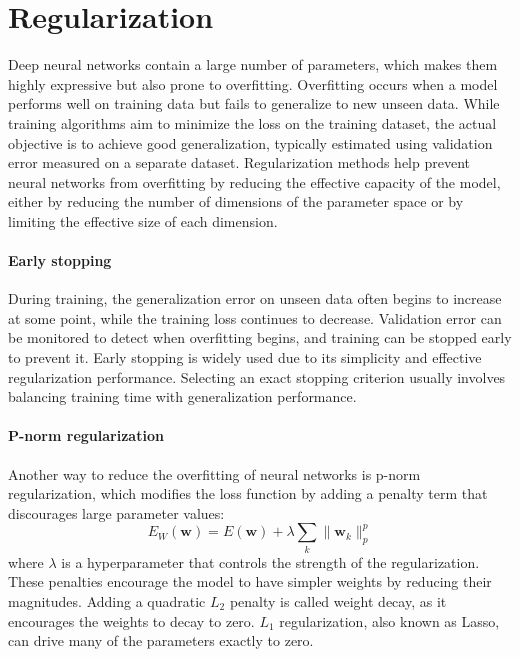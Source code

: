 \section{Regularization}
Deep neural networks contain a large number of parameters, which makes them highly expressive but also prone to overfitting. Overfitting occurs when a model performs well on training data but fails to generalize to new unseen data. While training algorithms aim to minimize the loss on the training dataset, the actual objective is to achieve good generalization, typically estimated using validation error measured on a separate dataset. Regularization methods help prevent neural networks from overfitting by reducing the effective capacity of the model, either by reducing the number of dimensions of the parameter space or by limiting the effective size of each dimension.~\cite{Krichen2023, Prechelt1998}

\paragraph{Early stopping} During training, the generalization error on unseen data often begins to increase at some point, while the training loss continues to decrease. Validation error can be monitored to detect when overfitting begins, and training can be stopped early to prevent it. Early stopping is widely used due to its simplicity and effective regularization performance. Selecting an exact stopping criterion usually involves balancing training time with generalization performance.~\cite{Prechelt1998}

\paragraph{P-norm regularization} Another way to reduce the overfitting of neural networks is p-norm regularization, which modifies the loss function by adding a penalty term that discourages large parameter values:
\begin{equation}
    E_W(\mathbf{w}) = E(\mathbf{w}) + \lambda\sum_k \lVert \mathbf{w}_k \rVert_p^p
\end{equation}
where $\lambda$ is a hyperparameter that controls the strength of the regularization. These penalties encourage the model to have simpler weights by reducing their magnitudes. Adding a quadratic $L_2$ penalty is called weight decay, as it encourages the weights to decay to zero. $L_1$ regularization, also known as Lasso, can drive many of the parameters exactly to zero.~\cite{Szeliski2022, Krichen2023}


